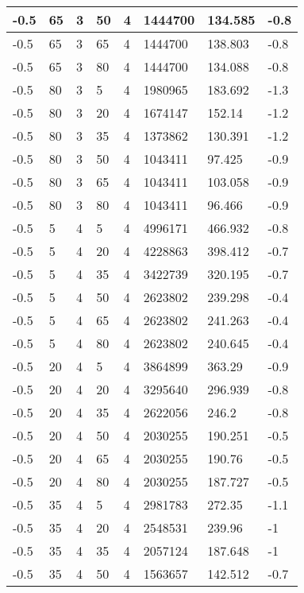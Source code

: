 \begin{longtable}{|p{1.4cm}|p{1.4cm}|p{1.4cm}|p{1.4cm}|p{1.4cm}|p{1.4cm}|p{1.4cm}|p{1.5cm}|}
        -0.5 & 65 & 3 & 50 & 4 & 1444700 & 134.585 & -0.8 \\ \hline
        -0.5 & 65 & 3 & 65 & 4 & 1444700 & 138.803 & -0.8 \\ \hline
        -0.5 & 65 & 3 & 80 & 4 & 1444700 & 134.088 & -0.8 \\ \hline
        -0.5 & 80 & 3 & 5 & 4 & 1980965 & 183.692 & -1.3 \\ \hline
        -0.5 & 80 & 3 & 20 & 4 & 1674147 & 152.14 & -1.2 \\ \hline
        -0.5 & 80 & 3 & 35 & 4 & 1373862 & 130.391 & -1.2 \\ \hline
        -0.5 & 80 & 3 & 50 & 4 & 1043411 & 97.425 & -0.9 \\ \hline
        -0.5 & 80 & 3 & 65 & 4 & 1043411 & 103.058 & -0.9 \\ \hline
        -0.5 & 80 & 3 & 80 & 4 & 1043411 & 96.466 & -0.9 \\ \hline
        -0.5 & 5 & 4 & 5 & 4 & 4996171 & 466.932 & -0.8 \\ \hline
        -0.5 & 5 & 4 & 20 & 4 & 4228863 & 398.412 & -0.7 \\ \hline
        -0.5 & 5 & 4 & 35 & 4 & 3422739 & 320.195 & -0.7 \\ \hline
        -0.5 & 5 & 4 & 50 & 4 & 2623802 & 239.298 & -0.4 \\ \hline
        -0.5 & 5 & 4 & 65 & 4 & 2623802 & 241.263 & -0.4 \\ \hline
        -0.5 & 5 & 4 & 80 & 4 & 2623802 & 240.645 & -0.4 \\ \hline
        -0.5 & 20 & 4 & 5 & 4 & 3864899 & 363.29 & -0.9 \\ \hline
        -0.5 & 20 & 4 & 20 & 4 & 3295640 & 296.939 & -0.8 \\ \hline
        -0.5 & 20 & 4 & 35 & 4 & 2622056 & 246.2 & -0.8 \\ \hline
        -0.5 & 20 & 4 & 50 & 4 & 2030255 & 190.251 & -0.5 \\ \hline
        -0.5 & 20 & 4 & 65 & 4 & 2030255 & 190.76 & -0.5 \\ \hline
        -0.5 & 20 & 4 & 80 & 4 & 2030255 & 187.727 & -0.5 \\ \hline
        -0.5 & 35 & 4 & 5 & 4 & 2981783 & 272.35 & -1.1 \\ \hline
        -0.5 & 35 & 4 & 20 & 4 & 2548531 & 239.96 & -1 \\ \hline
        -0.5 & 35 & 4 & 35 & 4 & 2057124 & 187.648 & -1 \\ \hline
        -0.5 & 35 & 4 & 50 & 4 & 1563657 & 142.512 & -0.7 \\ \hline

\end{longtable}
